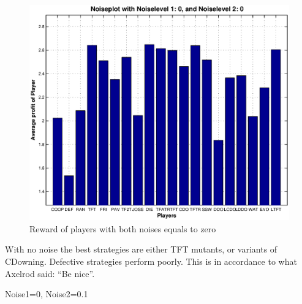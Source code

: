 \begin{figure}[h]
\begin{minipage}[hbt]{0.3\textwidth}
	\includegraphics[width=\textwidth]{pics/simulation2/Reward_of_all_Players_at_given_Noiselevels_1}
\end{minipage}	\caption{Reward of players with both noises equals to zero}
	\label{pic player noise1}
\end{figure}

With no noise the best strategies are either TFT mutants, or variants of CDowning. Defective strategies perform poorly. This is in accordance to what Axelrod said: “Be nice”.

Noise1=0, Noise2=0.1

